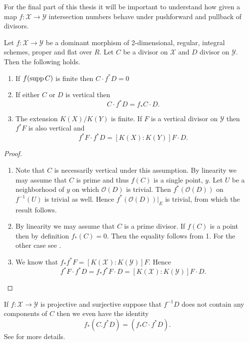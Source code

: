 For the final part of this thesis it will be important to understand how given a map $f: \mathscr X \to \mathscr Y$ intersection numbers behave under pushforward and pullback of divisors. 

\begin{theorem}
	Let $f:\mathscr X \to \mathscr Y$ be a dominant morphism of 2-dimensional, regular, integral schemes, proper and flat over $R$. 
	Let $C$ be a divisor on $\mathscr X$ and $D$ divisor on $\mathscr Y$. 
	Then the following holds.
	\begin{enumerate}
		\item If $f(\operatorname{supp} C)$ is finite then $C\cdot f^* D = 0$ 
		\item If either $C$ or $D$ is vertical then \begin{equation}\label{eq:projection_formula}
				C\cdot f^* D = f_* C \cdot D
			.\end{equation}
		\item The extension $K(X) / K(Y)$ is finite. 
			If $F$ is a vertical divisor on $\mathscr Y$ then $f^* F$ is also vertical and \[
				f^* F \cdot f^* D = [K(X): K(Y)] F \cdot D
			.\] 
	\end{enumerate}
\end{theorem}
\begin{proof}
	\begin{enumerate}
		\item Note that $C$ is necessarily vertical under this assumption. 
			By linearity we may assume that $C$ is prime and thus $f(C)$ is a single point, $y$. 
			Let $U$ be a neighborhood of  $y$ on which $\mathcal{O}(D)$ is trivial. 
			Then $f^*(\mathcal{O}(D))$ on $f^{-1}(U)$ is trivial as well. 
			Hence $f^*(\mathcal{O}(D))|_E$ is trivial, from which the result follows.
		\item By linearity we may assume that $C$ is a prime divisor.
			If $f(C)$ is a point then by definition $f_*(C) = 0$. Then the equality follows from 1. 
			For the other case see \cite[thm.\ 9.2.12]{liuAlgebraicGeometryArithmetic2002}. 
		\item 
			We know that $f_* f^* F = [K(\mathscr X): K(\mathscr Y)] F$. Hence  \[
				f^* F \cdot  f^* D = f_* f^* F \cdot D = [K(\mathscr X) : K(\mathscr Y)] F \cdot  D
			.\] 

	\end{enumerate}
\end{proof}

\begin{remark}
	If $f: \mathscr X \to \mathscr Y$ is projective and surjective suppose that $f^{-1}D$ does not contain any components of $C$ then we even have the identity  \[
		f_*(C . f^*D) = (f_*C \cdot f^* D)
	.\] 
	See \cite[rem.\ 9.2.13]{liuAlgebraicGeometryArithmetic2002} for more details. 
\end{remark}
